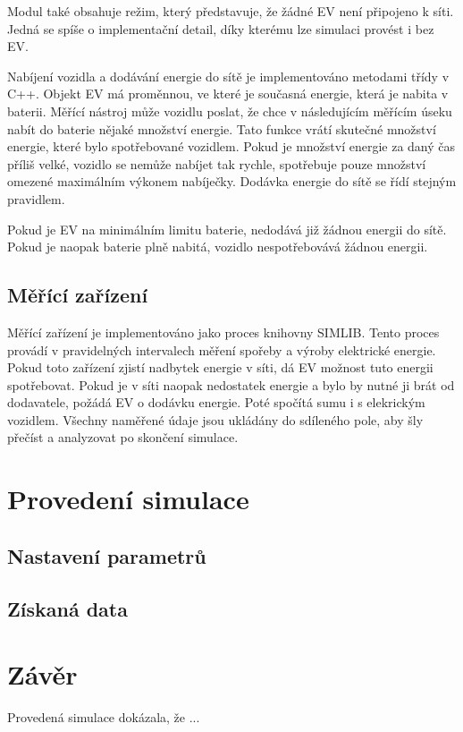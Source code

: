 \documentclass[12pt,a4paper]{article}
\begin{document}
Modul také obsahuje režim, který představuje, že žádné EV není připojeno k síti.
Jedná se spíše o implementační detail, díky kterému lze simulaci provést i bez EV.

Nabíjení vozidla a dodávání energie do sítě je implementováno metodami třídy v C++.
Objekt EV má proměnnou, ve které je současná energie, která je nabita v baterii.
Měřící nástroj může vozidlu poslat, že chce v následujícím měřícím úseku nabít do baterie nějaké množství energie.
Tato funkce vrátí skutečné množství energie, které bylo spotřebované vozidlem.
Pokud je množství energie za daný čas příliš velké,
vozidlo se nemůže nabíjet tak rychle, spotřebuje pouze množství omezené maximálním výkonem nabíječky.
Dodávka energie do sítě se řídí stejným pravidlem.

Pokud je EV na minimálním limitu baterie, nedodává již žádnou energii do sítě.
Pokud je naopak baterie plně nabitá, vozidlo nespotřebovává žádnou energii.

\subsection{Měřící zařízení}
Měřící zařízení je implementováno jako proces knihovny SIMLIB.
Tento proces provádí v pravidelných intervalech měření spořeby a výroby elektrické energie.
Pokud toto zařízení zjistí nadbytek energie v síti, dá EV možnost tuto energii spotřebovat.
Pokud je v síti naopak nedostatek energie a bylo by nutné ji brát od dodavatele, požádá EV o dodávku energie.
Poté spočítá sumu i s elekrickým vozidlem.
Všechny naměřené údaje jsou ukládány do sdíleného pole, aby šly přečíst a analyzovat po skončení simulace.

\section{Provedení simulace}

\subsection{Nastavení parametrů}

\subsection{Získaná data}


\section{Závěr}

Provedená simulace dokázala, že ...

\printbibliography
\end{document}

